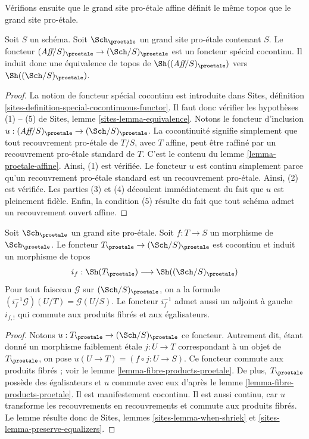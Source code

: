 \noindent
Vérifions ensuite que le grand site pro-\'etale affine définit le même
topos que le grand site pro-\'etale.

\begin{lemma}
\label{lemma-affine-big-site-proetale}
Soit $S$ un schéma. Soit $\Sch_\proetale$ un grand site pro-\'etale
contenant $S$.
Le foncteur $(\textit{Aff}/S)_\proetale \to (\Sch/S)_\proetale$
est un foncteur spécial cocontinu. Il induit donc une équivalence
de topos de $\Sh((\textit{Aff}/S)_\proetale)$ vers
$\Sh((\Sch/S)_\proetale)$.
\end{lemma}

\begin{proof}
La notion de foncteur spécial cocontinu est introduite dans
Sites, définition \ref{sites-definition-special-cocontinuous-functor}.
Il faut donc vérifier les hypothèses (1) -- (5) de
Sites, lemme \ref{sites-lemma-equivalence}.
Notons le foncteur d'inclusion
$u : (\textit{Aff}/S)_\proetale \to (\Sch/S)_\proetale$.
La cocontinuité signifie simplement que tout recouvrement pro-\'etale de
$T/S$, avec $T$ affine, peut être raffiné par un recouvrement pro-\'etale
standard de $T$. C'est le contenu du
lemme \ref{lemma-proetale-affine}.
Ainsi, (1) est vérifiée. Le foncteur $u$ est continu simplement parce qu'un recouvrement
pro-\'etale standard est un recouvrement pro-\'etale. Ainsi, (2) est vérifiée.
Les parties (3) et (4) découlent immédiatement du fait que $u$ est
pleinement fidèle. Enfin, la condition (5) résulte du
fait que tout schéma admet un recouvrement ouvert affine.
\end{proof}

\begin{lemma}
\label{lemma-put-in-T}
Soit $\Sch_\proetale$ un grand site pro-\'etale.
Soit $f : T \to S$ un morphisme de $\Sch_\proetale$.
Le foncteur $T_\proetale \to (\Sch/S)_\proetale$
est cocontinu et induit un morphisme de topos
$$
i_f :
\Sh(T_\proetale)
\longrightarrow
\Sh((\Sch/S)_\proetale)
$$
Pour tout faisceau $\mathcal{G}$ sur $(\Sch/S)_\proetale$,
on a la formule $(i_f^{-1}\mathcal{G})(U/T) = \mathcal{G}(U/S)$.
Le foncteur $i_f^{-1}$ admet aussi un adjoint à gauche $i_{f, !}$ qui commute
aux produits fibrés et aux égalisateurs.
\end{lemma}

\begin{proof}
Notons $u : T_\proetale \to (\Sch/S)_\proetale$ ce foncteur.
Autrement dit, étant donné un morphisme faiblement \'etale $j : U \to T$ correspondant
à un objet de $T_\proetale$, on pose $u(U \to T) = (f \circ j : U \to S)$.
Ce foncteur commute aux produits fibrés ; voir le
lemme \ref{lemma-fibre-products-proetale}.
De plus, $T_\proetale$ possède des égalisateurs et $u$ commute avec eux
d'après le lemme \ref{lemma-fibre-products-proetale}.
Il est manifestement cocontinu.
Il est aussi continu, car $u$ transforme les recouvrements en recouvrements et
commute aux produits fibrés. Le lemme résulte donc de
Sites, lemmes \ref{sites-lemma-when-shriek}
et \ref{sites-lemma-preserve-equalizers}.
\end{proof}

